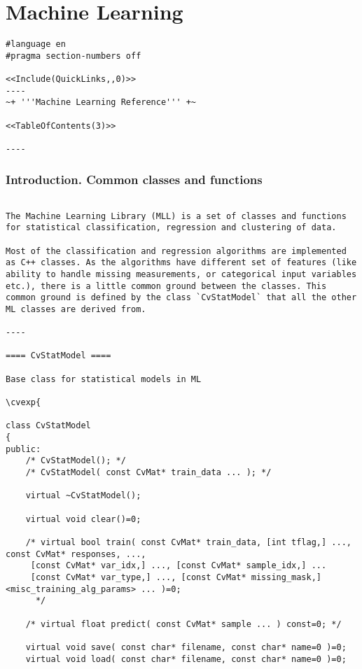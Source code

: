 \chapter{Machine Learning}
\begin{verbatim}
#language en
#pragma section-numbers off

<<Include(QuickLinks,,0)>>
----
~+ '''Machine Learning Reference''' +~

<<TableOfContents(3)>>

----

\end{verbatim}
\subsection{Introduction. Common classes and functions}
\begin{verbatim}

The Machine Learning Library (MLL) is a set of classes and functions for statistical classification, regression and clustering of data.

Most of the classification and regression algorithms are implemented as C++ classes. As the algorithms have different set of features (like ability to handle missing measurements, or categorical input variables etc.), there is a little common ground between the classes. This common ground is defined by the class `CvStatModel` that all the other ML classes are derived from.

----

==== CvStatModel ====

Base class for statistical models in ML

\cvexp{

class CvStatModel
{
public:
    /* CvStatModel(); */
    /* CvStatModel( const CvMat* train_data ... ); */

    virtual ~CvStatModel();

    virtual void clear()=0;

    /* virtual bool train( const CvMat* train_data, [int tflag,] ..., const CvMat* responses, ...,
     [const CvMat* var_idx,] ..., [const CvMat* sample_idx,] ...
     [const CvMat* var_type,] ..., [const CvMat* missing_mask,] <misc_training_alg_params> ... )=0;
      */

    /* virtual float predict( const CvMat* sample ... ) const=0; */

    virtual void save( const char* filename, const char* name=0 )=0;
    virtual void load( const char* filename, const char* name=0 )=0;


\end{verbatim}
